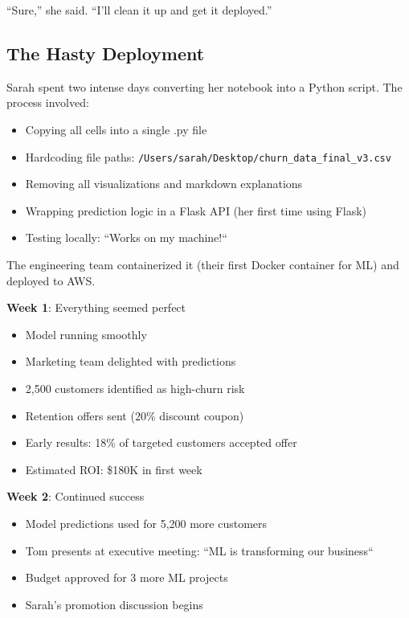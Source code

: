 ``Sure,'' she said. ``I'll clean it up and get it deployed.''

\subsection{The Hasty Deployment}

Sarah spent two intense days converting her notebook into a Python script. The process involved:

\begin{itemize}
    \item Copying all cells into a single .py file
    \item Hardcoding file paths: \texttt{/Users/sarah/Desktop/churn\_data\_final\_v3.csv}
    \item Removing all visualizations and markdown explanations
    \item Wrapping prediction logic in a Flask API (her first time using Flask)
    \item Testing locally: ``Works on my machine!``
\end{itemize}

The engineering team containerized it (their first Docker container for ML) and deployed to AWS.

\textbf{Week 1}: Everything seemed perfect
\begin{itemize}
    \item Model running smoothly
    \item Marketing team delighted with predictions
    \item 2,500 customers identified as high-churn risk
    \item Retention offers sent (20\% discount coupon)
    \item Early results: 18\% of targeted customers accepted offer
    \item Estimated ROI: \$180K in first week
\end{itemize}

\textbf{Week 2}: Continued success
\begin{itemize}
    \item Model predictions used for 5,200 more customers
    \item Tom presents at executive meeting: ``ML is transforming our business``
    \item Budget approved for 3 more ML projects
    \item Sarah's promotion discussion begins
\end{itemize}

